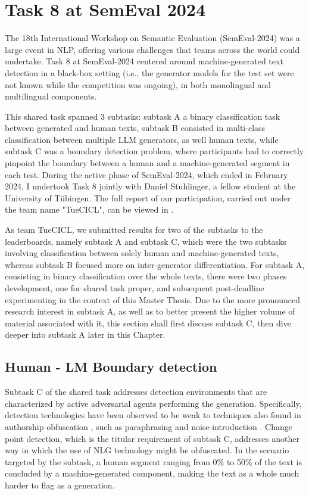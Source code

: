 \section{Task 8 at SemEval 2024}
\label{sec:task}

The 18th International Workshop on Semantic Evaluation (SemEval-2024) was a large event in NLP, offering various challenges that teams across the world could undertake.
Task 8 at SemEval-2024 \citep{wang2024semeval} centered around machine-generated text detection in a black-box setting (i.e., the generator models for the test set were not known while the competition was ongoing), in both monolingual and multilingual components.

This shared task spanned 3 subtasks: subtask A a binary classification task between generated and human texts, subtask B consisted in multi-class classification between multiple LLM generators, as well human texts, while subtask C was a boundary detection problem, where participants had to correctly pinpoint the boundary between a human and a machine-generated segment in each test.
During the active phase of SemEval-2024, which ended in February 2024, I undertook Task 8 jointly with Daniel Stuhlinger, a fellow student at the University of Tübingen.
The full report of our participation, carried out under the team name "TueCICL", can be viewed in \citet{stuhlinger-winkler-2024-tuecicl}.

As team TueCICL, we submitted results for two of the subtasks to the leaderboards, namely subtask A and subtask C, which were the two subtasks involving classification between solely human and machine-generated texts, whereas subtask B focused more on inter-generator differentiation.
For subtask A, consisting in binary classification over the whole texts, there were two phases development, one for shared task proper, and subsequent post-deadline experimenting in the context of this Master Thesis.
Due to the more pronounced research interest in subtask A, as well as to better present the higher volume of material associated with it, this section shall first discuss subtask C, then dive deeper into subtask A later in this Chapter.

\subsection{Human - LM Boundary detection}

Subtask C of the shared task addresses detection environments that are characterized by active adversarial agents performing the generation.
Specifically, detection technologies have been observed to be weak to techniques also found in authorship obfuscation \citep{macko2024authorship}, such as paraphrasing \citep{krishna2024paraphrasing} and noise-introduction \citep{wang2021adversarial}.
Change point detection, which is the titular requirement of subtask C, addresses another way in which the use of NLG technology might be obfuscated.
In the scenario targeted by the subtask, a human segment ranging from 0\% to 50\% of the text is concluded by a machine-generated component, making the text as a whole much harder to flag as a generation.

